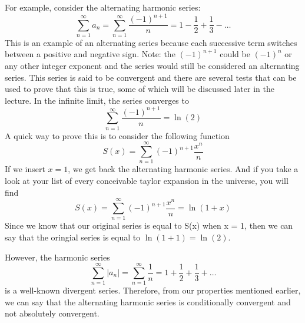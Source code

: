 \documentclass{article}
\newcommand{\be}{\begin{equation}}
\newcommand{\ee}{\end{equation}}
\begin{document}
For example, consider the alternating harmonic series:
\be
\sum_{n=1}^{\infty} a_n = \sum_{n = 1}^{\infty} \frac{(-1)^{n+1}}{n} = 1 - \frac{1}{2} + \frac{1}{3} - \hdots
\ee
This is an example of an alternating series because each successive term switches between a positive and negative sign.
Note: the $(-1)^{n+1}$ could be $(-1)^{n}$ or any other integer exponent and the series would still be considered an alternating series.
This series is said to be convergent and there are several tests that can be used to prove that this is true, some of which will be discussed later in the lecture.
In the infinite limit, the series converges to
\be
\sum_{n = 1}^{\infty} \frac{(-1)^{n+1}}{n} = \ln(2)
\ee
A quick way to prove this is to consider the following function
\be
S(x) = \sum_{n = 1}^{\infty} (-1)^{n+1} \frac{x^n}{n}
\ee
If we insert $x = 1$, we get back the alternating harmonic series.
And if you take a look at your list of every conceivable taylor expansion in the universe, you will find
\be
S(x) = \sum_{n = 1}^{\infty} (-1)^{n+1} \frac{x^n}{n} = \ln(1+x)
\ee
Since we know that our original series is equal to S(x) when x = 1, then we can say that the oringial series is equal to $\ln(1+1) = \ln(2)$.

However, the harmonic series
\be
\sum_{n=1}^{\infty} |a_n| = \sum_{n = 1}^{\infty} \frac{1}{n} = 1 + \frac{1}{2} + \frac{1}{3} + \hdots
\ee
is a well-known divergent series.
Therefore, from our properties mentioned earlier, we can say that the alternating harmonic series is conditionally convergent and not absolutely convergent.
\end{document}
